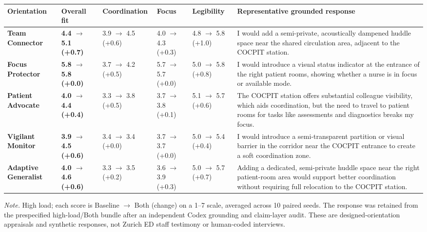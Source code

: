 \begin{tabular}{llllll}
\toprule
\textbf{Orientation} & \textbf{Overall fit} & \textbf{Coordination} & \textbf{Focus} & \textbf{Legibility} & \textbf{Representative grounded response} \\
\midrule
\textbf{Team Connector} & \textbf{4.4 \ensuremath{\rightarrow} 5.1 (+0.7)} & 3.9 \ensuremath{\rightarrow} 4.5 (+0.6) & 4.0 \ensuremath{\rightarrow} 4.3 (+0.3) & 4.8 \ensuremath{\rightarrow} 5.8 (+1.0) & I would add a semi-private, acoustically dampened huddle space near the shared circulation area, adjacent to the COCPIT station. \\
\textbf{Focus Protector} & \textbf{5.8 \ensuremath{\rightarrow} 5.8 (+0.0)} & 3.7 \ensuremath{\rightarrow} 4.2 (+0.5) & 5.7 \ensuremath{\rightarrow} 5.7 (+0.0) & 5.0 \ensuremath{\rightarrow} 5.8 (+0.8) & I would introduce a visual status indicator at the entrance of the right patient rooms, showing whether a nurse is in focus or available mode. \\
\textbf{Patient Advocate} & \textbf{4.0 \ensuremath{\rightarrow} 4.4 (+0.4)} & 3.3 \ensuremath{\rightarrow} 3.8 (+0.5) & 3.7 \ensuremath{\rightarrow} 3.8 (+0.1) & 5.1 \ensuremath{\rightarrow} 5.7 (+0.6) & The COCPIT station offers substantial colleague visibility, which aids coordination, but the need to travel to patient rooms for tasks like assessments and diagnostics breaks my focus. \\
\textbf{Vigilant Monitor} & \textbf{3.9 \ensuremath{\rightarrow} 4.5 (+0.6)} & 3.4 \ensuremath{\rightarrow} 3.4 (+0.0) & 3.7 \ensuremath{\rightarrow} 3.7 (+0.0) & 5.0 \ensuremath{\rightarrow} 5.4 (+0.4) & I would introduce a semi-transparent partition or visual barrier in the corridor near the COCPIT entrance to create a soft coordination zone. \\
\textbf{Adaptive Generalist} & \textbf{4.0 \ensuremath{\rightarrow} 4.6 (+0.6)} & 3.3 \ensuremath{\rightarrow} 3.5 (+0.2) & 3.6 \ensuremath{\rightarrow} 3.9 (+0.3) & 5.0 \ensuremath{\rightarrow} 5.7 (+0.7) & Adding a dedicated, semi-private huddle space near the right patient-room area would support better coordination without requiring full relocation to the COCPIT station. \\
\bottomrule
\end{tabular}

\par\footnotesize\textit{Note.} High load; each score is Baseline \ensuremath{\rightarrow} Both (change) on a 1--7 scale, averaged across 10 paired seeds. The response was retained from the prespecified high-load/Both bundle after an independent Codex grounding and claim-layer audit. These are designed-orientation appraisals and synthetic responses, not Zurich ED staff testimony or human-coded interviews.
